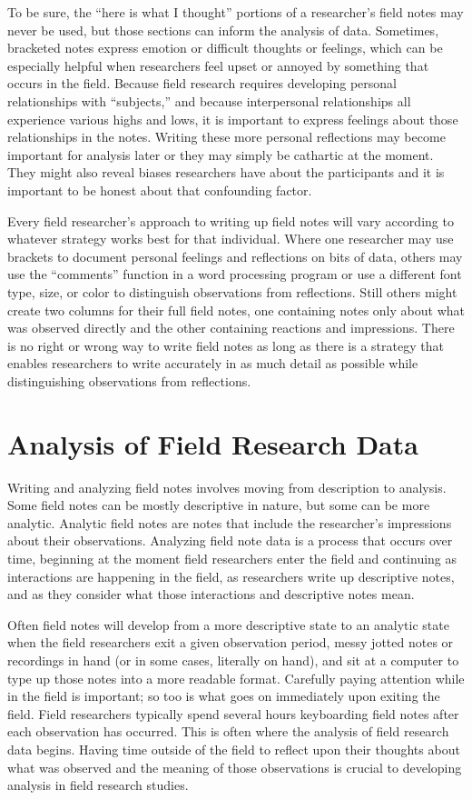 To be sure, the ``here is what I thought'' portions of a researcher's field notes may never be used, but those sections can inform the analysis of data. Sometimes, bracketed notes express emotion or difficult thoughts or feelings, which can be especially helpful when researchers feel upset or annoyed by something that occurs in the field. Because field research requires developing personal relationships with ``subjects,'' and because interpersonal relationships all experience various highs and lows, it is important to express feelings about those relationships in the notes. Writing these more personal reflections may become important for analysis later or they may simply be cathartic at the moment. They might also reveal biases researchers have about the participants and it is important to be honest about that confounding factor.

Every field researcher's approach to writing up field notes will vary according to whatever strategy works best for that individual. Where one researcher may use brackets to document personal feelings and reflections on bits of data, others may use the ``comments'' function in a word processing program or use a different font type, size, or color to distinguish observations from reflections. Still others might create two columns for their full field notes, one containing notes only about what was observed directly and the other containing reactions and impressions. There is no right or wrong way to write field notes as long as there is a strategy that enables researchers to write accurately in as much detail as possible while distinguishing observations from reflections.

\section{Analysis of Field Research Data}

Writing and analyzing field notes involves moving from description to analysis. Some field notes can be mostly descriptive in nature, but some can be more analytic. Analytic field notes are notes that include the researcher's impressions about their observations. Analyzing field note data is a process that occurs over time, beginning at the moment field researchers enter the field and continuing as interactions are happening in the field, as researchers write up descriptive notes, and as they consider what those interactions and descriptive notes mean.

Often field notes will develop from a more descriptive state to an analytic state when the field researchers exit a given observation period, messy jotted notes or recordings in hand (or in some cases, literally on hand), and sit at a computer to type up those notes into a more readable format. Carefully paying attention while in the field is important; so too is what goes on immediately upon exiting the field. Field researchers typically spend several hours keyboarding field notes after each observation has occurred. This is often where the analysis of field research data begins. Having time outside of the field to reflect upon their thoughts about what was observed and the meaning of those observations is crucial to developing analysis in field research studies.

